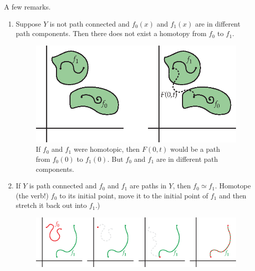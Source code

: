 A few remarks. 
\begin{enumerate}
	\item Suppose $Y$ is not path connected and $f_0(x)$ and $f_1(x)$ are in different path components. Then there does not exist a homotopy from $f_0$ to $f_1$.
	\begin{figure}[ht!]
	    \centering
	    \includegraphics[width=300pt]{images/homotopy/not_path_connected}
	    \caption{If $f_0$ and $f_1$ were homotopic, then $F(0,t)$ would be a path from $f_0(0)$ to $f_1(0)$.  But $f_0$ and $f_1$ are in different path components.}
    \end{figure}
	\item If $Y$ is path connected and $f_0$ and $f_1$ are paths in $Y$, then $f_0 \simeq f_1$. Homotope (the verb!) $f_0$ to its initial point, move it to the initial point of $f_1$ and then stretch it back out into $f_1$.) 
	\begin{figure}[ht!]
	    \centering
	    \includegraphics[width=450pt]{images/homotopy/paths_are_homotopic}
    \end{figure}
\end{enumerate}
